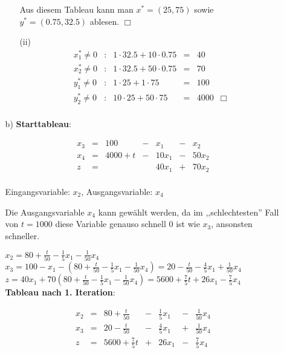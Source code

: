 \documentclass[a4paper,11pt]{article}
\newcommand{\bra}[1]{\left(#1\right)}
\begin{document}
\begin{enumerate}
\begin{enumerate}
\begin{enumerate}
            Aus diesem Tableau kann man $x^* = (25, 75)$ sowie $y^* = (0.75, 32.5)$
            ablesen. $\Box$

        \item[(ii)]
            \[\begin{array}{lclcll}
                x_1^* \neq 0 &:&  1 \cdot 32.5 + 10 \cdot 0.75 &=& 40 \\
                x_2^* \neq 0 &:&  1 \cdot 32.5 + 50 \cdot 0.75 &=& 70 \\
                y_1^* \neq 0 &:&  1 \cdot   25 +  1 \cdot   75 &=& 100 \\
                y_2^* \neq 0 &:& 10 \cdot   25 + 50 \cdot   75 &=& 4000 & \Box \\
            \end{array}\]

        \end{enumerate}

    \item[b)]
        \textbf{Starttableau}:

        \[\begin{array}{rcrcrcr}
            x_3 & = &  100 & - &   x_1 & - &   x_2 \\
            x_4 & = & 4000+t & - & 10x_1 & - & 50x_2 \\ \hline
              z & = &      &   & 40x_1 & + & 70x_2\\
        \end{array}\]

        Eingangsvariable: $x_2$, Ausgangsvariable: $x_4$

        Die Ausgangsvariable $x_4$ kann gewählt werden, da im ,,schlechtesten'' Fall
        von $t=1000$ diese Variable genauso schnell $0$ ist wie $x_3$, ansonsten schneller.

        \( x_2 = 80 + \frac{t}{50} - \frac{1}{5}x_1 - \frac{1}{50}x_4 \) \\
        \( x_3 = 100 - x_1 - \bra{80 + \frac{t}{50} - \frac{1}{5}x_1 - \frac{1}{50}x_4} = 20 - \frac{t}{50} - \frac{4}{5}x_1 + \frac{1}{50}x_4 \)\\
        \( z = 40x_1 + 70\bra{80 + \frac{t}{50} - \frac{1}{5}x_1 - \frac{1}{50}x_4} = 5600 + \frac{7}{5}t + 26x_1 - \frac{7}{5}x_4 \)\\

        \textbf{Tableau nach 1. Iteration}:

        \[\begin{array}{rcrcrcr}
            x_2 & = &   80+\frac{t}{50} & - & \frac{1}{5}x_1 & - & \frac{1}{50}x_4 \\
            x_3 & = &   20-\frac{t}{50} & - & \frac{4}{5}x_1 & + & \frac{1}{50}x_4 \\ \hline
              z & = & 5600+\frac{7}{5}t & + &          26x_1 & - & \frac{7}{5}x_4\\
        \end{array}\]


\end{enumerate}
\end{enumerate}
\end{document}
